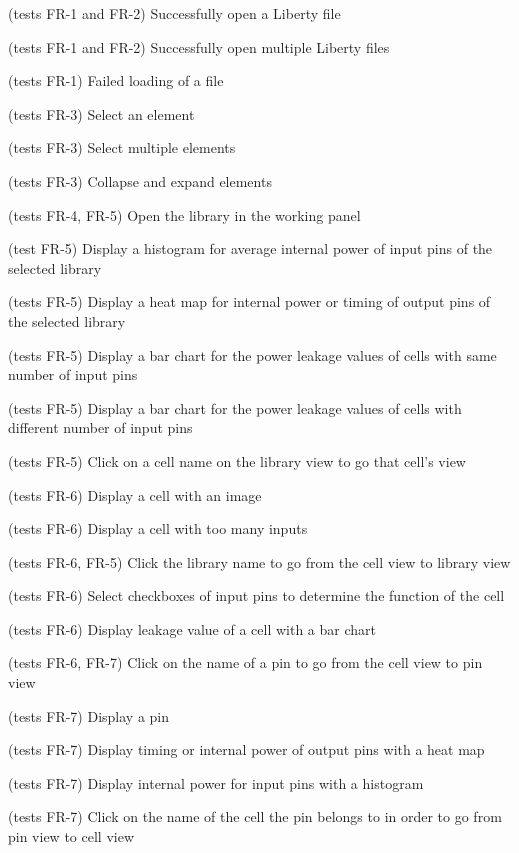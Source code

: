 \documentclass[10pt,a4paper]{report}
\begin{document}
\begin{GTC}
    \item  (tests FR-1 and FR-2) Successfully open a Liberty file
    \item  (tests FR-1 and FR-2) Successfully open multiple Liberty files
    \item  (tests FR-1) Failed loading of a file
    \item  (tests FR-3) Select an element
    \item  (tests FR-3) Select multiple elements
    \item  (tests FR-3) Collapse and expand elements
    \item  (tests FR-4, FR-5) Open the library in the working panel
    \item  (test FR-5) Display a histogram for average internal power of input pins of the selected library
    \item  (tests FR-5) Display a heat map for internal power or timing of output pins of the selected library
    \item  (tests FR-5) Display a bar chart for the power leakage values of cells with same number of input pins
    \item  (tests FR-5) Display a bar chart for the power leakage values of cells with different number of input pins
    \item  (tests FR-5) Click on a cell name on the library view to go that cell's view
    \item  (tests FR-6) Display a cell with an image
    \item  (tests FR-6) Display a cell with too many inputs
    \item  (tests FR-6, FR-5) Click the library name to go from the cell view to library view
    \item  (tests FR-6) Select checkboxes of input pins to determine the function of the cell
    \item  (tests FR-6) Display leakage value of a cell with a bar chart
    \item  (tests FR-6, FR-7) Click on the name of a pin to go from the cell view to pin view
    \item  (tests FR-7) Display a pin
    \item  (tests FR-7) Display timing or internal power of output pins with a heat map
    \item  (tests FR-7) Display internal power for input pins with a histogram
    \item  (tests FR-7) Click on the name of the cell the pin belongs to in order to go from pin view to cell view

\end{GTC}
\end{document}
